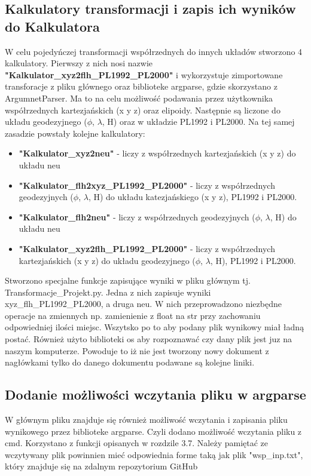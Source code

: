 \subsection{Kalkulatory transformacji i zapis ich wyników do Kalkulatora}
W celu pojedyńczej transformacji współrzednych do innych układów stworzono 4 kalkulatory. Pierwszy z nich nosi nazwie \textbf{"Kalkulator\_{}xyz2flh\_{}PL1992\_{}PL2000"} i wykorzystuje zimportowane transforacje z pliku głównego oraz biblioteke argparse, gdzie skorzystano z ArgumnetParser. Ma to na celu możliwość podawania przez użytkownika współrzednych kartezjańskich (x y z) oraz elipoidy. Następnie są liczone do układu geodezyjnego ($\phi$, $\lambda$, H) oraz w układzie PL1992 i PL2000. Na tej samej zasadzie powstały kolejne kalkulatory:
\begin{itemize}
	\item \textbf{"Kalkulator\_{}xyz2neu"} - liczy z współrzednych kartezjańskich (x y z) do układu neu
    \item \textbf{"Kalkulator\_{}flh2xyz\_{}PL1992\_{}PL2000"} - liczy z współrzednych geodezyjnych ($\phi$, $\lambda$, H) do układu katezjańskiego (x y z), PL1992 i PL2000. 
    \item \textbf{"Kalkulator\_{}flh2neu"} - liczy z współrzednych geodezyjnych ($\phi$, $\lambda$, H) do układu neu
    \item \textbf{"Kalkulator\_{}xyz2flh\_{}PL1992\_{}PL2000"} - liczy z współrzednych kartezjańskich (x y z) do układu geodezyjnego ($\phi$, $\lambda$, H), PL1992 i PL2000.
\end{itemize}
Stworzono specjalne funkcje zapisujące wyniki w pliku głównym tj. Transformacje\_{}Projekt.py. Jedna z nich zapisuje wyniki xyz\_{}flh\_{}PL1992\_{}PL2000, a druga neu. W nich przeprowadzono niezbędne operacje na zmiennych np. zamienienie z float na str przy zachowaniu odpowiedniej ilości miejsc. Wszytsko po to aby podany plik wynikowy miał ładną postać. Również użyto biblioteki os aby rozpoznawać czy dany plik jest juz na naszym komputerze. Powoduje to iż nie jest tworzony nowy dokument z nagłówkami tylko do danego dokumentu podawane są kolejne liniki.

\subsection{Dodanie możliwości wczytania pliku w argparse}
W głównym pliku znajduje się również możliwość wczytania i zapisania pliku wynikowego przez biblioteke argparse.  Czyli dodano możliwość wczytania pliku z cmd. Korzystano z funkcji opisanych w rozdzile 3.7. Należy pamiętać ze wczytywany plik powinnien mieć odpowiednia forme taką jak plik "wsp\_{}inp.txt", który znajduje się na zdalnym repozytorium GitHub


